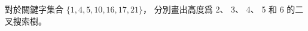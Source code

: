 \startEXERCISE
對於關鍵字集合 $\{1,4,5,10,16,17,21\}$，
分別畫出高度爲 2、 3、 4、 5 和 6 的二叉搜索樹。
\stopEXERCISE

\startANSWER
\externalfigure[e12_1_1-1]
\externalfigure[e12_1_1-2]
\externalfigure[e12_1_1-3]
\externalfigure[e12_1_1-4]
\externalfigure[e12_1_1-5]
\stopANSWER

